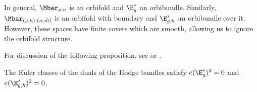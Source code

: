 \begin{remark} \label{orbifold}
In general, $\Mbar_{g,n}$ is an orbifold and $\E_g^*$ an orbibundle. Similarly, $\Mbar_{(g,h),(n,\vec{m})}$ is an orbifold with boundary and $\E_{g,h}^*$ an orbibundle over it. However, these spaces have finite covers which are smooth, allowing us to ignore the orbifold structure.
\end{remark}

For discussion of the following proposition, see \cite{harris} or \cite{mumford}.

\begin{proposition} \label{eSquared}
The Euler classes of the duals of the Hodge bundles satisfy $e(\E_g^*)^2=0$ and $e(\E_{g,h}^*)^2=0$.
\end{proposition}
